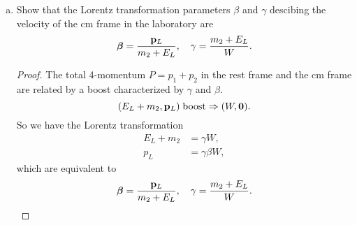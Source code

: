 \documentclass[10pt]{article}
\begin{document}
\begin{enumerate}[(a)]
\begin{proof}
			Compare with the results we have 
			\begin{equation}
				m_2 p_L = p_0 W \Longrightarrow \vb{p}_0 = \frac{m_2 \vb{p}_L}{W}.
			\end{equation}
		\end{proof}
	\item Show that the Lorentz transformation parameters $\beta$ and $\gamma$ descibing the velocity of the cm frame in the laboratory are
		\begin{equation}
			\vb*{\beta} = \frac{\vb{p}_L}{m_2 + E_L}\qc \gamma = \frac{m_2 + E_L}{W}.
		\end{equation}
		\begin{proof}
			The total 4-momentum $P = p_1 + p_2$ in the rest frame and the cm frame are related by a boost characterized by $\gamma$ and $\beta$.
		 \begin{equation}
			 (E_L + m_2, \vb{p}_L) \; \text{boost} \Rightarrow (W, \vb{0}).
		\end{equation}
		So we have the Lorentz transformation 
		\begin{align*}
			E_L + m_2 &= \gamma W, \\
			p_L &= \gamma \beta W, 
		\end{align*}
		which are equivalent to 
		\begin{equation}
			\vb*{\beta} = \frac{\vb{p}_L}{m_2 + E_L}\qc \gamma = \frac{m_2 + E_L}{W}.
		\end{equation}
		\end{proof}
\end{enumerate}
\end{document}
